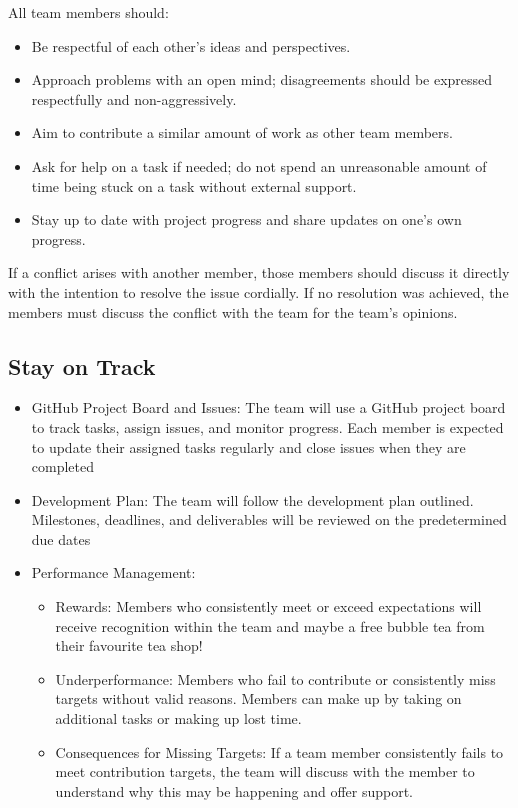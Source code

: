 \documentclass{article}
\begin{document}
All team members should:

\begin{itemize}
    \item Be respectful of each other’s ideas and perspectives.
    \item Approach problems with an open mind; disagreements should be expressed respectfully and non-aggressively.
    \item Aim to contribute a similar amount of work as other team members.
    \item Ask for help on a task if needed; do not spend an unreasonable amount of time being stuck on a task without external support.
    \item Stay up to date with project progress and share updates on one’s own progress.
\end{itemize}

If a conflict arises with another member, those members should discuss it directly with the intention to resolve the issue cordially. If no resolution was achieved, the members must discuss the conflict with the team for the team’s opinions.

\subsection{Stay on Track}

\begin{itemize}
    \item GitHub Project Board and Issues: The team will use a GitHub project board to track tasks, assign issues, and monitor progress. Each member is expected to update their assigned tasks regularly and close issues when they are completed
    \item Development Plan: The team will follow the development plan outlined. Milestones, deadlines, and deliverables will be reviewed on the predetermined due dates
    \item Performance Management:
        \begin{itemize}
        \item Rewards: Members who consistently meet or exceed expectations will receive recognition within the team and maybe a free bubble tea from their favourite tea shop!
        \item Underperformance: Members who fail to contribute or consistently miss targets without valid reasons. Members can make up by taking on additional tasks or making up lost time.
        \item Consequences for Missing Targets: If a team member consistently fails to meet contribution targets, the team will discuss with the member to understand why this may be happening and offer support.
        \end{itemize}
\end{itemize}
\end{document}
